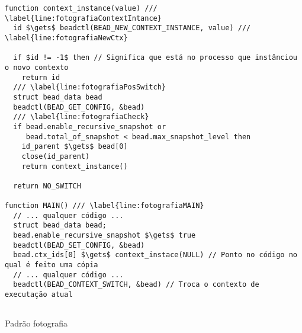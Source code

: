 \begin{pseudocode}
\begin{lstlisting}[language=pseudocode, style=pseudocode]
function context_instance(value) /// \label{line:fotografiaContextIntance}
  id $\gets$ beadctl(BEAD_NEW_CONTEXT_INSTANCE, value) /// \label{line:fotografiaNewCtx}

  if $id != -1$ then // Significa que está no processo que instânciou o novo contexto
    return id
  /// \label{line:fotografiaPosSwitch}
  struct bead_data bead
  beadctl(BEAD_GET_CONFIG, &bead)
  /// \label{line:fotografiaCheck}
  if bead.enable_recursive_snapshot or
     bead.total_of_snapshot < bead.max_snapshot_level then
    id_parent $\gets$ bead[0]
    close(id_parent)
    return context_instance()

  return NO_SWITCH

function MAIN() /// \label{line:fotografiaMAIN}
  // ... qualquer código ...
  struct bead_data bead;
  bead.enable_recursive_snapshot $\gets$ true
  beadctl(BEAD_SET_CONFIG, &bead)
  bead.ctx_ids[0] $\gets$ context_instace(NULL) // Ponto no código no qual é feito uma cópia
  // ... qualquer código ...
  beadctl(BEAD_CONTEXT_SWITCH, &bead) // Troca o contexto de executação atual
  
\end{lstlisting}

  \caption{Padrão fotografia}
  \label{alg:fotografia}
\end{pseudocode}
